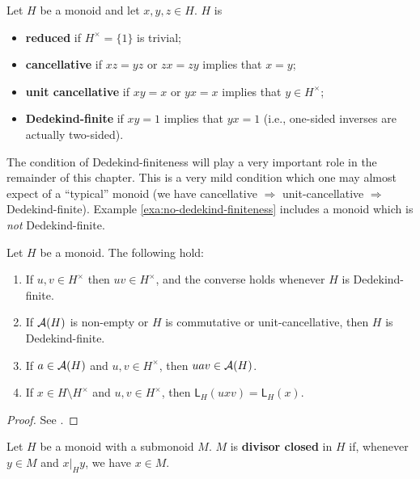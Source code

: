 \begin{defn} \label{def:monoid properties}
	Let $H$ be a monoid and let $x,y,z\in H$.  
	$H$ is 
	\begin{itemize}
		\item \textbf{reduced} if $H^\times = \{1\}$ is trivial;
		\item \textbf{cancellative} if $xz = yz$ or $zx=zy$ implies that $x=y$;
		\item \textbf{unit cancellative} if $xy=x$ or $yx=x$ implies that $y\in H^\times$;
		\item \textbf{Dedekind-finite} if $xy=1$ implies that $yx=1$ (i.e., one-sided inverses are actually two-sided).
	\end{itemize}
\end{defn}
The condition of Dedekind-finiteness will play a very important role in the remainder of this chapter. 
This is a very mild condition which one may almost expect of a ``typical'' monoid (we have cancellative $\Rightarrow$ unit-cancellative $\Rightarrow$ Dedekind-finite).
Example \ref{exa:no-dedekind-finiteness} includes a monoid which is \textit{not} Dedekind-finite.


\begin{prop}\label{prop:unit-adjust}
	Let $H$ be a monoid.
	The following hold:
	\begin{enumerate}[label={\rm (\roman{*})}]
		\item\label{it:prop:unit-adjust(0)} If $u, v \in H^\times$ then $uv \in H^\times$, and the converse holds whenever $H$ is Dedekind-finite.
		\item\label{it:prop:unit-adjust(0b)} If $\mathcal{A}(H)$ is non-empty or $H$ is commutative or unit-cancellative, then $H$ is Dedekind-finite.
		\item\label{it:prop:unit-adjust(i)} If $a\in \mathcal{A}(H)$ and $u, v \in H^\times$, then $uav\in \mathcal{A}(H)$.
		\item\label{it:prop:unit-adjust(ii)} If $x\in H\setminus H^\times$ and $u, v \in H^\times$, then $\mathsf{L}_H(uxv) = \mathsf{L}_H(x)$.
	\end{enumerate}
\end{prop}
%
\begin{proof}
	See \cite[parts (i), (ii), and (iv) of Lemma 2.2, and Proposition 2.30]{fan-tringali18}.
\end{proof}
%
%
\begin{defn} \label{def:divisor closed}
	Let $H$ be a monoid with a submonoid $M$.
	$M$ is \textbf{divisor closed} in $H$ if, whenever $y\in M$ and $x|_H y$, we have $x\in M$.
\end{defn}

